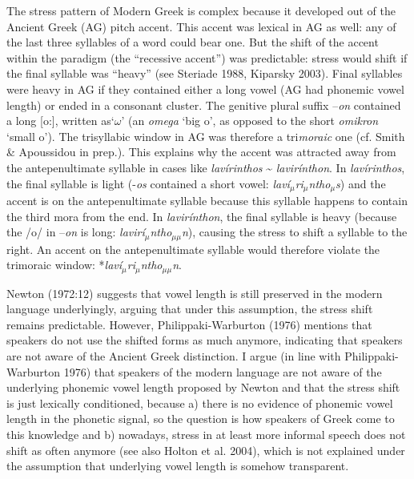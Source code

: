 \documentclass[a4paper]{article}
\newcommand\textsubscript[1]{\ensuremath{{}_{\text{#1}}}}
\begin{document}
The stress pattern of Modern Greek is complex because it developed out of the Ancient Greek (AG) pitch accent. This accent was lexical in AG as well: any of the last three syllables of a word could bear one. But the shift of the accent within the paradigm (the “recessive accent”) was predictable: stress would shift if the final syllable was “heavy” (see Steriade 1988, Kiparsky 2003). Final syllables were heavy in AG if they contained either a long vowel (AG had phonemic vowel length) or ended in a consonant cluster. The genitive plural suffix –\textit{on} contained a long [o:], written as‘$\omega $’ (an \textit{omega} ‘big o’, as opposed to the short \textit{omikron} ‘small o’). The trisyllabic window in AG was therefore a tri\textit{moraic} one (cf. Smith \& Apoussidou in prep.). This explains why the accent was attracted away from the antepenultimate syllable in cases like \textit{lavírinthos} \~{} \textit{lavirínthon}. In \textit{lavírinthos}, the final syllable is light (-\textit{os} contained a short vowel: \textit{laví}\textit{\textsubscript{$\mu $}}\textit{ri}\textit{\textsubscript{$\mu $}}\textit{ntho}\textit{\textsubscript{$\mu $}}\textit{s}) and the accent is on the antepenultimate syllable because this syllable happens to contain the third mora from the end. In \textit{lavirínthon}, the final syllable is heavy (because the /o/ in –\textit{on} is long: \textit{lavirí}\textit{\textsubscript{$\mu $}}\textit{ntho}\textit{\textsubscript{$\mu \mu $}}\textit{n}), causing the stress to shift a syllable to the right. An accent on the antepenultimate syllable would therefore violate the trimoraic window: *\textit{laví}\textit{\textsubscript{$\mu $}}\textit{ri}\textit{\textsubscript{$\mu $}}\textit{ntho}\textit{\textsubscript{$\mu \mu $}}\textit{n}.

Newton (1972:12) suggests that vowel length is still preserved in the modern language underlyingly, arguing that under this assumption, the stress shift remains predictable. However, Philippaki-Warburton (1976) mentions that speakers do not use the shifted forms as much anymore, indicating that speakers are not aware of the Ancient Greek distinction. I argue (in line with Philippaki-Warburton 1976) that speakers of the modern language are not aware of the underlying phonemic vowel length proposed by Newton and that the stress shift is just lexically conditioned, because a) there is no evidence of phonemic vowel length in the phonetic signal, so the question is how speakers of Greek come to this knowledge and b) nowadays, stress in at least more informal speech does not shift as often anymore (see also Holton et al. 2004), which is not explained under the assumption that underlying vowel length is somehow transparent.
\end{document}

